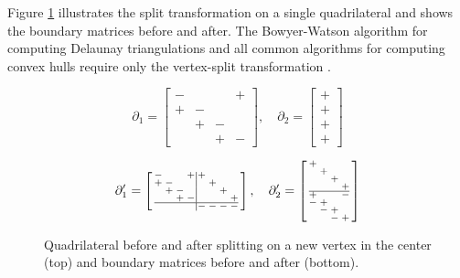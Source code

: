 \documentclass[twocolumn]{article}
\makeatletter
\newenvironment{smallarray}[1]
 {\null\,\vcenter\bgroup\scriptsize
  \renewcommand{\arraystretch}{0.7}%
  \arraycolsep=.13885em
  \hbox\bgroup$\array{@{}#1@{}}}
 {\endarray$\egroup\egroup\,\null}
\makeatother
\begin{document}
Figure \ref{fig:split-transformation} illustrates the split transformation on a single quadrilateral and shows the boundary matrices before and after.
The Bowyer-Watson algorithm for computing Delaunay triangulations and all common algorithms for computing convex hulls require only the vertex-split transformation \cite{cheng2013delaunay}.

\begin{figure}[h]
    \begin{center}
        
    \end{center}

    \begin{equation*}
        \partial_1 = \left[\begin{smallmatrix}
            - &   &   & + \\
            + & - &   &   \\
              & + & - &   \\
              &   & + & -
        \end{smallmatrix}\right],
        \quad
        \partial_2 = \left[\begin{smallmatrix}
            + \\ + \\ + \\ +
        \end{smallmatrix}\right]
    \end{equation*}

    \begin{equation*}
        \partial_1' = \left[\begin{smallarray}{cccc|cccc}
            - &   &   & + & + &   &   &   \\
            + & - &   &   &   & + &   &   \\
              & + & - &   &   &   & + &   \\
              &   & + & - &   &   &   & + \\
            \hline
              &   &   &   & - & - & - & -
        \end{smallarray}\right], \quad
        \partial_2' = \left[\begin{smallarray}{cccc}
            + &   &   &   \\
              & + &   &   \\
              &   & + &   \\
              &   &   & + \\
            \hline
            + &   &   & - \\
            - & + &   &   \\
              & - & + &   \\
              &   & - & +
        \end{smallarray}\right]
    \end{equation*}

    \caption{Quadrilateral before and after splitting on a new vertex in the center (top) and boundary matrices before and after (bottom).}
    \label{fig:split-transformation}
\end{figure}
\end{document}
